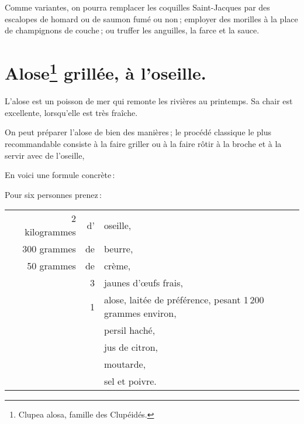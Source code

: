 \sk

Comme variantes, on pourra remplacer les coquilles Saint-Jacques par des
escalopes de homard ou de saumon fumé ou non ; employer des morilles à la place
de champignons de couche ; ou truffer les anguilles, la farce et la sauce.

\section*{\centering Alose\footnote{Clupea alosa, famille des Clupéidés.} grillée, à l'oseille.}

L'alose est un poisson de mer qui remonte les rivières au printemps. Sa chair
est excellente, lorsqu'elle est très fraîche.

On peut préparer l'alose de bien des manières ; le procédé classique le plus
recommandable consiste à la faire griller ou à la faire rôtir à la broche et
à la servir avec de l'oseille,

En voici une formule concrète :

\medskip

Pour six personnes prenez :

\medskip

\footnotesize
\begin{longtable}{rrrrp{16em}}
  & \multicolumn{2}{r}{2 kilogrammes} & d’ & oseille,                                                     \\
  & \multicolumn{2}{r}{300 grammes}   & de & beurre,                                                      \\
  & \multicolumn{2}{r}{ 50 grammes}   & de & crème,                                                       \\
  &     &             &  3 & jaunes d'œufs frais,                                                         \\
  &     &             &  1 & alose, laitée de préférence, pesant 1 200 grammes environ,                   \\
  &     &             &    & persil haché,                                                                \\
  &     &             &    & jus de citron,                                                               \\
  &     &             &    & moutarde,                                                                    \\
  &     &             &    & sel et poivre.                                                               \\
\end{longtable}
\normalsize

